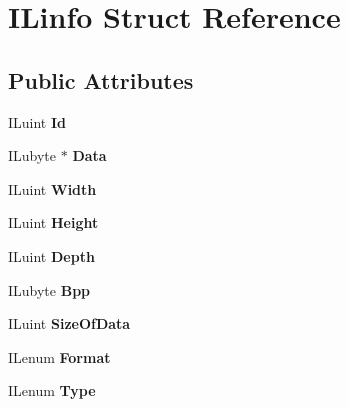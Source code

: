 \hypertarget{structILinfo}{
\section{ILinfo Struct Reference}
\label{structILinfo}
}
\subsection*{Public Attributes}
\begin{DoxyCompactItemize}
\item 
\hypertarget{structILinfo_ad7897159f2327bc2a319087c373086db}{
ILuint {\bfseries Id}}
\label{structILinfo_ad7897159f2327bc2a319087c373086db}

\item 
\hypertarget{structILinfo_a7fb653f278716b32e95fbd6435975436}{
ILubyte $\ast$ {\bfseries Data}}
\label{structILinfo_a7fb653f278716b32e95fbd6435975436}

\item 
\hypertarget{structILinfo_a7b95a84136103daf4ee35c7fd72b8117}{
ILuint {\bfseries Width}}
\label{structILinfo_a7b95a84136103daf4ee35c7fd72b8117}

\item 
\hypertarget{structILinfo_aa3bd30c9f9882e3c97a0a95af4609558}{
ILuint {\bfseries Height}}
\label{structILinfo_aa3bd30c9f9882e3c97a0a95af4609558}

\item 
\hypertarget{structILinfo_aa563678d24ee6d994d6a91823b5ff3aa}{
ILuint {\bfseries Depth}}
\label{structILinfo_aa563678d24ee6d994d6a91823b5ff3aa}

\item 
\hypertarget{structILinfo_a889805b301c732475ed50a78e643a67e}{
ILubyte {\bfseries Bpp}}
\label{structILinfo_a889805b301c732475ed50a78e643a67e}

\item 
\hypertarget{structILinfo_afee15ab4c442646a428ea11adbad0d4a}{
ILuint {\bfseries SizeOfData}}
\label{structILinfo_afee15ab4c442646a428ea11adbad0d4a}

\item 
\hypertarget{structILinfo_aee02af2d876001643be54e700169e574}{
ILenum {\bfseries Format}}
\label{structILinfo_aee02af2d876001643be54e700169e574}

\item 
\hypertarget{structILinfo_ab3f105dee24a40dce85616b4d2562eb1}{
ILenum {\bfseries Type}}
\label{structILinfo_ab3f105dee24a40dce85616b4d2562eb1}


\end{DoxyCompactItemize}
